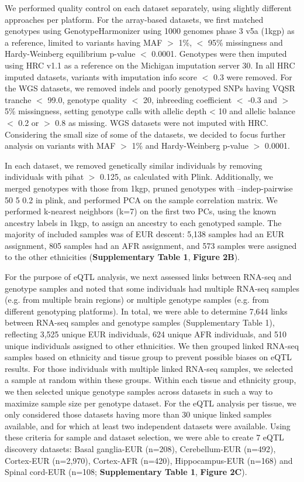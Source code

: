 {{We performed quality control on each dataset separately, using slightly different approaches per platform. For the array-based datasets, we first matched genotypes using GenotypeHarmonizer\cite{deelenGenotypeHarmonizerAutomatic2014} using 1000 genomes phase 3 v5a (1kgp) as a reference, limited to variants having MAF $>$ 1\%, $<$ 95\% missingness and Hardy-Weinberg equilibrium p-value $<$ 0.0001. Genotypes were then imputed using HRC v1.1 as a reference on the Michigan imputation server 30. In all HRC imputed datasets, variants with imputation info score $<$ 0.3 were removed. For the WGS datasets, we removed indels and poorly genotyped SNPs having VQSR tranche $<$ 99.0, genotype quality $<$ 20, inbreeding coefficient $<$ -0.3 and $>$ 5\% missingness, setting genotype calls with allelic depth < 10 and allelic balance $<$ 0.2 or $>$ 0.8 as missing. WGS datasets were not imputed with HRC. Considering the small size of some of the datasets, we decided to focus further analysis on variants with MAF $>$ 1\% and Hardy-Weinberg p-value $>$ 0.0001. 

In each dataset, we removed genetically similar individuals by removing individuals with pihat $>$ 0.125, as calculated with Plink. Additionally, we merged genotypes with those from 1kgp, pruned genotypes with --indep-pairwise 50 5 0.2 in plink, and performed PCA on the sample correlation matrix. We performed k-nearest neighbors (k=7) on the first two PCs, using the known ancestry labels in 1kgp, to assign an ancestry to each genotyped sample. The majority of included samples was of EUR descent: 5,138 samples had an EUR assignment, 805 samples had an AFR assignment, and 573 samples were assigned to the other ethnicities (\textbf{Supplementary Table 1}, \textbf{Figure 2B}). 

For the purpose of eQTL analysis, we next assessed links between RNA-seq and genotype samples and noted that some individuals had multiple RNA-seq samples (e.g. from multiple brain regions) or multiple genotype samples (e.g. from different genotyping platforms). In total, we were able to determine 7,644 links between RNA-seq samples and genotype samples (Supplementary Table 1), reflecting 3,525 unique EUR individuals, 624 unique AFR individuals, and 510 unique individuals assigned to other ethnicities. We then grouped linked RNA-seq samples based on ethnicity and tissue group to prevent possible biases on eQTL results. For those individuals with multiple linked RNA-seq samples, we selected a sample at random within these groups. Within each tissue and ethnicity group, we then selected unique genotype samples across datasets in such a way to maximize sample size per genotype dataset. For the eQTL analysis per tissue, we only considered those datasets having more than 30 unique linked samples available, and for which at least two independent datasets were available. Using these criteria for sample and dataset selection, we were able to create 7 eQTL discovery datasets: Basal ganglia-EUR (n=208), Cerebellum-EUR (n=492), Cortex-EUR (n=2,970), Cortex-AFR (n=420), Hippocampus-EUR (n=168) and Spinal cord-EUR (n=108; \textbf{Supplementary Table 1}, \textbf{Figure 2C}). 

}}
